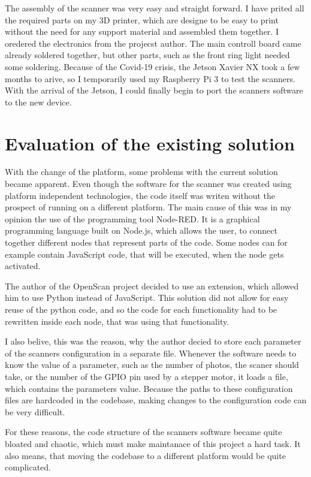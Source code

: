 The assembly of the scanner was very easy and straight forward.
I have prited all the required parts on my 3D printer, which are designe to be easy to print without the need for any support material and assembled them together.
I oredered the electronics from the projecst author. The main controll board came already soldered together, but other parts, such as the front ring light needed some soldering.
Because of the Covid-19 crisis, the Jetson Xavier NX took a few months to arive, so I temporarily used my Raspberry Pi 3 to test the scanners.
With the arrival of the Jetson, I could finally begin to port the scanners software to the new device.


\section{Evaluation of the existing solution}
With the change of the platform, some problems with the current solution became apparent.
Even though the software for the scanner was created using platform independent technologies, the code itself was writen without the prospect of running on a different platform.
The main cause of this was in my opinion the use of the programming tool Node-RED.
It is a graphical programming language built on Node.js, which allows the user, to connect together different nodes that represent parts of the code. \cite{node-red}
Some nodes can for example contain JavaScript code, that will be executed, when the node gets activated.

The author of the OpenScan project decided to use an extension, which allowed him to use Python instead of JavaScript.
This solution did not allow for easy reuse of the python code, and so the code for each functionality had to be rewritten inside each node, that was using that functionality.

I also belive, this was the reason, why the author decied to store each parameter of the scanners configuration in a separate file.
Whenever the software needs to know the value of a parameter, such as the number of photos, the scaner should take, or the number of the GPIO pin used by a stepper motor, it loads a file, which contains the parameters value.
Because the paths to these configuration files are hardcoded in the codebase, making changes to the configuration code can be very difficult.

For these reasons, the code structure of the scanners software became quite bloated and chaotic, which must make maintanace of this project a hard task.
It also means, that moving the codebase to a different platform would be quite complicated.


